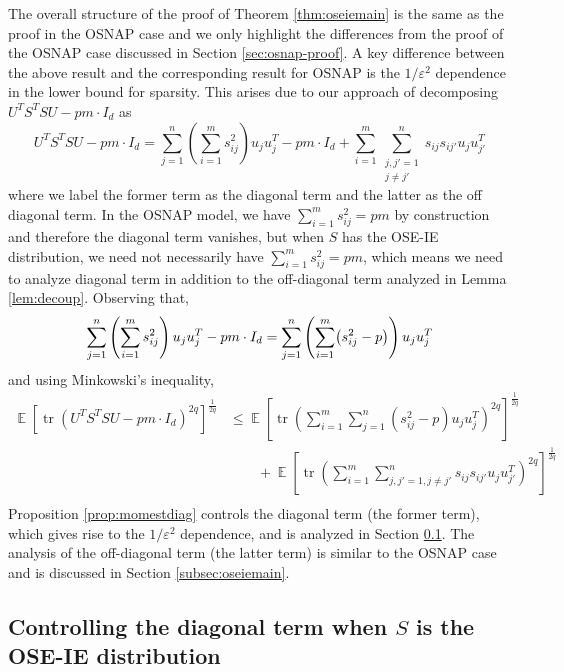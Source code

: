 \documentclass[11pt]{amsart}
\numberwithin{equation}{section}
\numberwithin{equation}{section}
\DeclareMathOperator{\E}{\mathbb{E}}
\DeclareMathOperator*{\tr}{tr}
\DeclarePairedDelimiter{\paren}{(}{)}
\theoremstyle{remark}
\theoremstyle{definition}
\begin{document}
The overall structure of the proof of Theorem \ref{thm:oseiemain} is the same as the proof in the OSNAP case and we only highlight the differences from the proof of the OSNAP case discussed in Section \ref{sec:osnap-proof}. A key difference between the above result and the corresponding result for OSNAP is the $1/\varepsilon^2$ dependence in the lower bound for sparsity. This arises due to our approach of decomposing $U^TS^TSU - pm\cdot I_d$ as
\[ U^TS^TSU - pm\cdot I_d  =  \sum_{j=1}^n \left( \sum_{i=1}^m s_{ij}^2 \right) u_ju_j^T  - pm\cdot I_d + \sum_{i=1}^m \sum_{\substack{j,j' =1 \\ j \neq j'}}^n s_{ij}s_{ij'} u_ju_{j'}^T  \]
where we label the former term as the diagonal term and the latter as the off diagonal term. In the OSNAP model, we have $\sum_{i=1}^m s_{ij}^2 = pm$ by construction and therefore the diagonal term vanishes, but when $S$ has the OSE-IE distribution, we need not necessarily have $\sum_{i=1}^m s_{ij}^2 = pm$, which means we need to analyze diagonal term in addition to the off-diagonal term analyzed in Lemma \ref{lem:decoup}. Observing that, 
\[ \sum_{j=1}^n \left( \sum_{i=1}^m s_{ij}^2 \right) u_ju_j^T  - pm\cdot I_d = \sum_{j=1}^n \left( \sum_{i=1}^m \paren*{s_{ij}^2 - p} \right) u_ju_j^T \]
and using Minkowski's inequality,
\begin{align*}
    \E [ \tr (U^TS^TSU - pm\cdot I_d)^{2q} ]^\frac{1}{2q} &\le \E \left[ \tr \left( \sum_{i=1}^m \sum_{j =1}^n (s_{ij}^2 - p)u_ju_{j}^T \right)^{2q} \right]^\frac{1}{2q} \\
    & \qquad + \E \left[ \tr \left( \sum_{i=1}^m \sum_{j,j' =1, j \neq j'}^n s_{ij}s_{ij'} u_ju_{j'}^T \right)^{2q} \right]^\frac{1}{2q} \\
\end{align*}
Proposition \ref{prop:momestdiag} controls the diagonal term (the former term), which gives rise to the $1/\varepsilon^2$ dependence, and is analyzed in Section \ref{subsec:oseiediag}. The analysis of the off-diagonal term (the latter term) is similar to the OSNAP case and is discussed in Section \ref{subsec:oseiemain}.

\subsection{Controlling the diagonal term when $S$ is the OSE-IE distribution} \label{subsec:oseiediag}
\end{document}
